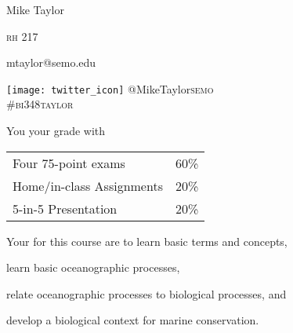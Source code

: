 \documentclass[t]{beamer}
\begin{document}

{
\begin{frame}[t]
\end{frame}
}

{
\begin{frame}[t,plain]
\large
\vspace{5ex}
\hangpara\hspace{17em} Mike Taylor

\hangpara\hspace{17em} \textsc{rh} 217

\hangpara\hspace{17em} mtaylor@semo.edu

	\hangpara \hspace{17em} \texttt{[image: twitter\_icon]} @MikeTaylor\textsc{semo}\\
\hspace{17em} \#\textsc{bi}348\textsc{taylor}
\end{frame}
}

\begin{frame}[t]{You  your grade with}
	\begin{center}\large\begin{tabular}{@{}ll@{}}
	Four 75-point exams & 60\% \\
	Home/in-class Assignments & 20\% \\
	5-in-5 Presentation & 20\% \\
	\end{tabular}
	\end{center}
\end{frame}

{
\begin{frame}[t]
\end{frame}
}

\begin{frame}[t]{Your  for this course are to}
	\hangpara learn basic terms and concepts,

	\hangpara learn basic oceanographic processes,
	
	\hangpara relate oceanographic processes to biological processes, and

	\hangpara develop a biological context for marine conservation.
	
	

\end{frame}
\end{document}
